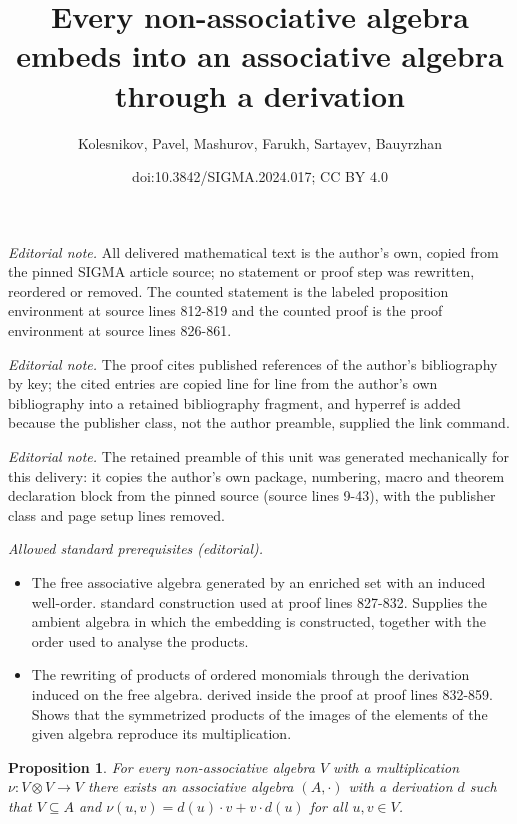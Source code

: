\documentclass[10pt,a4paper]{amsart}
\title{Every non-associative algebra embeds into an associative algebra through a derivation}
\author{Kolesnikov, Pavel, Mashurov, Farukh, Sartayev, Bauyrzhan}
\date{doi:10.3842/SIGMA.2024.017; CC BY 4.0}
\numberwithin{equation}{section}
\newtheorem{Proposition}[Theorem]{Proposition}
 { \theoremstyle{definition}
\newtheorem{Definition}[Theorem]{Definition}
\newtheorem{Note}[Theorem]{Note}
\newtheorem{Example}[Theorem]{Example}
\newtheorem{Remark}[Theorem]{Remark} }
\begin{document}
\maketitle
\setcounter{section}{3}
\setcounter{Theorem}{6}
\noindent\textit{Editorial note.} All delivered mathematical text is the author's own, copied from the pinned SIGMA article source; no statement or proof step was rewritten, reordered or removed. The counted statement is the labeled proposition environment at source lines 812-819 and the counted proof is the proof environment at source lines 826-861.\par\medskip
\noindent\textit{Editorial note.} The proof cites published references of the author's bibliography by key; the cited entries are copied line for line from the author's own bibliography into a retained bibliography fragment, and hyperref is added because the publisher class, not the author preamble, supplied the link command.\par\medskip
\noindent\textit{Editorial note.} The retained preamble of this unit was generated mechanically for this delivery: it copies the author's own package, numbering, macro and theorem declaration block from the pinned source (source lines 9-43), with the publisher class and page setup lines removed.\par\medskip
\noindent\textit{Allowed standard prerequisites (editorial).}\begin{itemize}
\item The free associative algebra generated by an enriched set with an induced well-order. standard construction used at proof lines 827-832. Supplies the ambient algebra in which the embedding is constructed, together with the order used to analyse the products.
\item The rewriting of products of ordered monomials through the derivation induced on the free algebra. derived inside the proof at proof lines 832-859. Shows that the symmetrized products of the images of the elements of the given algebra reproduce its multiplication.
\end{itemize}\medskip
\begin{Proposition}\label{prop:DerAComm}
For every non-associative algebra $V$ with
a multiplication $\nu \colon V\otimes V \to V$
there exists an associative algebra $(A,\cdot )$
with a derivation $d$ such that
$V\subseteq A$ and $\nu (u,v) = d(u)\cdot v + v\cdot d(u)$
for all $u,v\in V$.
\end{Proposition}
\end{document}
